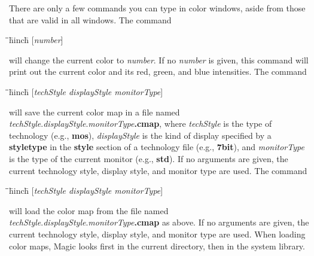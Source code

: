 \documentclass[letterpaper,twoside,12pt]{article}
\def\hinch{\hspace*{0.5in}}
\def\starti{\begin{center}\begin{tabbing}\hinch\=\hinch\=\hinch\=hinch\hinch\=\kill}
\def\endi{\end{tabbing}\end{center}}
\def\ii{\>\>\>}
\begin{document}
There are only a few commands you can type in color windows, aside from
those that are valid in all windows.  The command

\starti
   \ii {\bfseries :color }[{\itshape number}]
\endi

will change the current color to {\itshape number}.  If no {\itshape number}
is given, this command will print out the current color and its
red, green, and blue intensities.  The command

\starti
   \ii {\bfseries :save }[{\itshape techStyle displayStyle monitorType}]
\endi

will save the current color map in a file named
{\itshape techStyle}.{\itshape displayStyle}.{\itshape monitorType}{\bfseries .cmap},
where {\itshape techStyle} is the type of technology (e.g., {\bfseries mos}),
{\itshape displayStyle} is the kind of display specified by
a {\bfseries styletype} in the {\bfseries style} section of a technology file 
(e.g., {\bfseries 7bit}), and {\itshape monitorType} is the type of
the current monitor (e.g., {\bfseries std}).
If no arguments are given,
the current technology style, display style, and monitor type
are used.
The command

\starti
   \ii {\bfseries :load }[{\itshape techStyle displayStyle monitorType}]
\endi

will load the color map from the file named
{\itshape techStyle}.{\itshape displayStyle}.{\itshape monitorType}{\bfseries .cmap}
as above.
If no arguments are given,
the current technology style, display style, and monitor type
are used.  When loading color
maps, Magic looks first in the current directory, then in the
system library.
\end{document}

